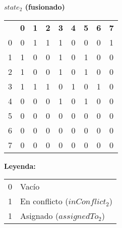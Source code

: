 \documentclass[a4paper,11pt]{article}
\begin{document}
\begin{center}
    \textbf{$state_2$ (fusionado)} \\[4pt]
    \begin{tabular}{c@{\hskip 1em}*{8}{c}}
        \rowcolor{white}
          & \textbf{0}             & \textbf{1}             & \textbf{2}             & \textbf{3}             & \textbf{4}             & \textbf{5}           & \textbf{6}           & \textbf{7}           \\
        0 & \cellcolor{white}0     & \cellcolor{yellow!40}1 & \cellcolor{yellow!40}1 & \cellcolor{yellow!40}1 & \cellcolor{white}0     & \cellcolor{white}0   & \cellcolor{white}0   & \cellcolor{gray!30}1 \\
        1 & \cellcolor{yellow!40}1 & \cellcolor{white}0     & \cellcolor{white}0     & \cellcolor{yellow!40}1 & \cellcolor{white}0     & \cellcolor{gray!30}1 & \cellcolor{white}0   & \cellcolor{white}0   \\
        2 & \cellcolor{yellow!40}1 & \cellcolor{white}0     & \cellcolor{white}0     & \cellcolor{yellow!40}1 & \cellcolor{white}0     & \cellcolor{gray!30}1 & \cellcolor{white}0   & \cellcolor{white}0   \\
        3 & \cellcolor{yellow!40}1 & \cellcolor{yellow!40}1 & \cellcolor{yellow!40}1 & \cellcolor{white}0     & \cellcolor{yellow!40}1 & \cellcolor{white}0   & \cellcolor{gray!30}1 & \cellcolor{white}0   \\
        4 & \cellcolor{white}0     & \cellcolor{white}0     & \cellcolor{white}0     & \cellcolor{yellow!40}1 & \cellcolor{white}0     & \cellcolor{gray!30}1 & \cellcolor{white}0   & \cellcolor{white}0   \\
        5 & \cellcolor{white}0     & \cellcolor{white}0     & \cellcolor{white}0     & \cellcolor{white}0     & \cellcolor{white}0     & \cellcolor{white}0   & \cellcolor{white}0   & \cellcolor{white}0   \\
        6 & \cellcolor{white}0     & \cellcolor{white}0     & \cellcolor{white}0     & \cellcolor{white}0     & \cellcolor{white}0     & \cellcolor{white}0   & \cellcolor{white}0   & \cellcolor{white}0   \\
        7 & \cellcolor{white}0     & \cellcolor{white}0     & \cellcolor{white}0     & \cellcolor{white}0     & \cellcolor{white}0     & \cellcolor{white}0   & \cellcolor{white}0   & \cellcolor{white}0   \\
    \end{tabular}

    \vspace{1em}
    \textbf{Leyenda:}

    \begin{tabular}{ll}
        \cellcolor{white}0     & Vacío                         \\
        \cellcolor{yellow!40}1 & En conflicto ($inConflict_2$) \\
        \cellcolor{gray!30}1   & Asignado ($assignedTo_2$)     \\
    \end{tabular}
\end{center}
\end{document}
